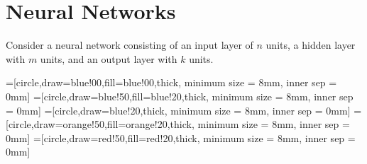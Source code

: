 \documentclass{report}
\begin{document}
\chapter{Neural Networks}
Consider a neural network consisting of an input layer of $n$
units, a hidden layer with $m$ units, and an output layer 
with $k$ units.

=[circle,draw=blue!00,fill=blue!00,thick,
                        minimum size = 8mm, inner sep = 0mm]
=[circle,draw=blue!50,fill=blue!20,thick,
                        minimum size = 8mm, inner sep = 0mm]
=[circle,draw=blue!20,thick,
                        minimum size = 8mm, inner sep = 0mm]
=[circle,draw=orange!50,fill=orange!20,thick,
                        minimum size = 8mm, inner sep = 0mm]
=[circle,draw=red!50,fill=red!20,thick,
                        minimum size = 8mm, inner sep = 0mm]
\end{document}
